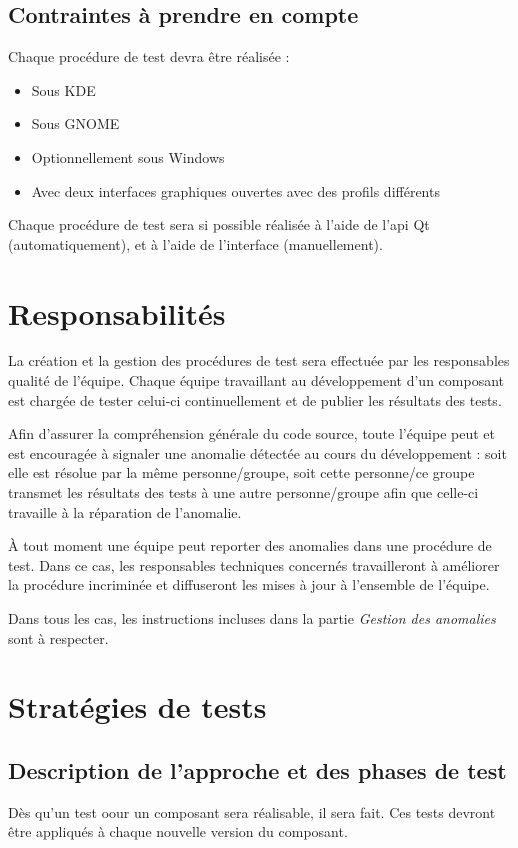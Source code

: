 \documentclass{../res/univ-projet}
\begin{document}
\subsection{Contraintes à prendre en compte}
Chaque procédure de test devra être réalisée :
\begin{itemize}
 \item Sous KDE
 \item Sous GNOME
 \item Optionnellement sous Windows
 \item Avec deux interfaces graphiques ouvertes avec des profils différents
\end{itemize}
Chaque procédure de test sera si possible réalisée à l'aide de l'api Qt (automatiquement), et à l'aide de l'interface (manuellement).



\section{Responsabilités}

  La création et la gestion des procédures de test sera effectuée par les responsables qualité de l'équipe. Chaque équipe travaillant au développement d'un composant est chargée de tester celui-ci continuellement et de publier les résultats des tests.
  
  Afin d'assurer la compréhension générale du code source, toute l'équipe peut et est encouragée à signaler une anomalie détectée au cours du développement : soit elle est résolue par la même personne/groupe, soit cette personne/ce groupe transmet les résultats 
  des tests à une autre personne/groupe afin que celle-ci travaille à la réparation de l'anomalie.
  
  À tout moment une équipe peut reporter des anomalies dans une procédure de test. Dans ce cas, les responsables techniques concernés travailleront à améliorer la procédure incriminée et diffuseront les mises à jour à l'ensemble de l'équipe.

  Dans tous les cas, les instructions incluses dans la partie \emph{Gestion des anomalies} sont à respecter.


\section{Stratégies de tests}

\subsection{Description de l'approche et des phases de test}
Dès qu'un test oour un composant sera réalisable, il sera fait. Ces tests devront être appliqués à chaque nouvelle version du composant.
\end{document}
